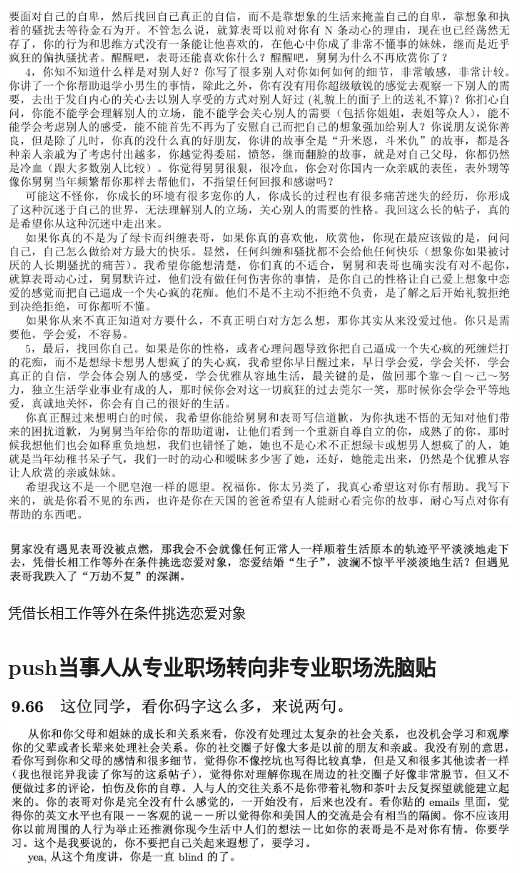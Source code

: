 \documentclass[9pt, b5paper]{article}
\begin{document}
\begin{center}
\includegraphics[width=.9\linewidth]{./pic/p1p110.png}
\end{center}


\begin{center}
\includegraphics[width=.9\linewidth]{./pic/p1p70.png}
\end{center}
凭借长相工作等外在条件挑选恋爱对象

\subsection{push当事人从专业职场转向非专业职场洗脑贴}
\label{sec:orgdb09dae}

\begin{center}
\includegraphics[width=.9\linewidth]{./pic/p1p115.png}
\end{center}
\end{document}
